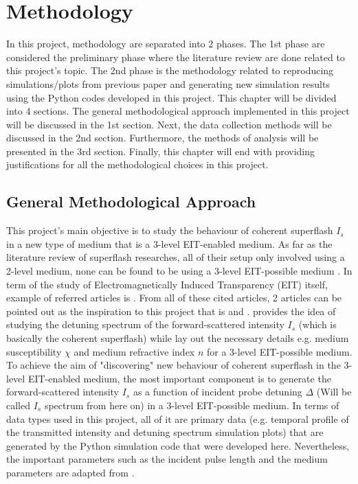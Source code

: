\chapter{Methodology}
In this project, methodology are separated into 2 phases. The 1st phase are considered the preliminary phase where the literature review are done related to this project's topic. The 2nd phase is the methodology related to reproducing simulations/plots from previous paper and generating new simulation results using the Python codes developed in this project. This chapter will be divided into 4 sections. The general methodological approach implemented in this project will be discussed in the 1st section. Next, the data collection methods will be discussed in the 2nd section. Furthermore, the methods of analysis will be presented in the 3rd section. Finally, this chapter will end with providing justifications for all the methodological choices in this project.

\section{General Methodological Approach}
This project's main objective is to study the behaviour of coherent superflash $I_{s}$ in a new type of medium that is a 3-level EIT-enabled medium. As far as the literature review of superflash researches, all of their setup only involved using a 2-level medium, none can be found to be using a 3-level EIT-possible medium \cite{Kwong2014, Kwong2015, Kwong2017, Kwong2020}. In term of the study of Electromagnetically Induced Transparency (EIT) itself, example of referred articles is \cite{Gea-Banacloche1995, Braje2004}. From all of these cited articles, 2 articles can be pointed out as the inspiration to this project that is \cite{Kwong2014} and \cite{jeong2010slow}. \cite{Kwong2014} provides the idea of studying the detuning spectrum of the forward-scattered intensity $I_{s}$ (which is basically the coherent superflash) while \cite{jeong2010slow} lay out the necessary details e.g. medium susceptibility $\chi$ and medium refractive index $n$ for a 3-level EIT-possible medium.\\

To achieve the aim of "discovering" new behaviour of coherent superflash in the 3-level EIT-enabled medium, the most important component is to generate the forward-scattered intensity $I_{s}$ as a function of incident probe detuning $\Delta$ (Will be called $I_{s}$ spectrum from here on) in a 3-level EIT-possible medium. In terms of data types used in this project, all of it are primary data (e.g. temporal profile of the transmitted intensity and detuning spectrum simulation plots) that are generated by the Python simulation code that were developed here. Nevertheless, the important parameters such as the incident pulse length and the medium parameters are adapted from \cite{jeong2010slow}.\\

